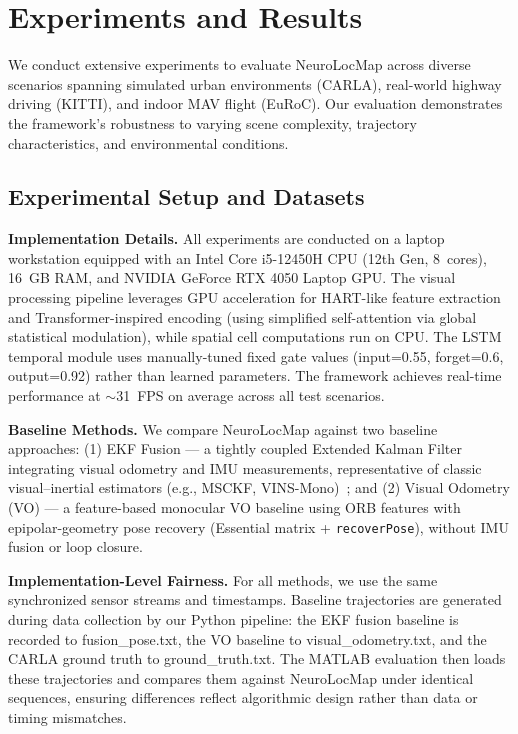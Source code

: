 ﻿%
\renewcommand{\topfraction}{0.85}       %
\renewcommand{\textfraction}{0.10}      %
\renewcommand{\floatpagefraction}{0.75} %

\section{Experiments and Results}
\label{sec:experiments}

We conduct extensive experiments to evaluate NeuroLocMap across diverse scenarios spanning simulated urban environments (CARLA), real-world highway driving (KITTI), and indoor MAV flight (EuRoC). Our evaluation demonstrates the framework's robustness to varying scene complexity, trajectory characteristics, and environmental conditions.

\subsection{Experimental Setup and Datasets}

\textbf{Implementation Details.} All experiments are conducted on a laptop workstation equipped with an Intel Core i5-12450H CPU (12th Gen, 8~cores), 16~GB RAM, and NVIDIA GeForce RTX 4050 Laptop GPU. The visual processing pipeline leverages GPU acceleration for HART-like feature extraction and Trans\-form\-er-in\-spired encoding (using simplified self-attention via global statistical modulation), while spatial cell computations run on CPU. The LSTM temporal module uses manually-tuned fixed gate values (input=0.55, forget=0.6, output=0.92) rather than learned parameters. The framework achieves real-time per\-for\-mance at $\sim$31~FPS on average across all test scenarios.

\textbf{Baseline Methods.} We compare NeuroLocMap against two baseline approaches: (1) EKF Fusion --- a tightly coupled Extended Kalman Filter integrating visual odometry and IMU measurements, representative of classic visual--inertial estimators (e.g., MSCKF, VINS-Mono)~\cite{Mourikis2007,Qin2018}; and (2) Visual Odometry (VO) --- a feature-based monocular VO baseline using ORB features with epipolar-geometry pose recovery (Essential matrix + \texttt{recoverPose}), without IMU fusion or loop closure.

\textbf{Implementation-Level Fairness.} For all methods, we use the same synchronized sensor streams and timestamps. Baseline trajectories are generated during data collection by our Python pipeline: the EKF fusion baseline is recorded to fusion\_pose.txt, the VO baseline to visual\_odometry.txt, and the CARLA ground truth to ground\_truth.txt. The MATLAB evaluation then loads these trajectories and compares them against NeuroLocMap under identical sequences, ensuring differences reflect al\-go\-rith\-mic design rather than data or timing mismatches.

